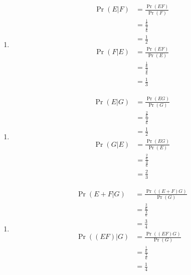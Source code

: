 \documentclass{beamer}
\providecommand{\pr}[1]{\ensuremath{\Pr\left(#1\right)}}
\newcounter{saveenumi}
\newcommand{\conti}{\setcounter{enumi}{\value{saveenumi}}}
\begin{document}
\begin{frame}{}
		\begin{enumerate}
			\item 
			\begin{align}
         \pr{E|F}&=\frac{\pr{EF}}{\pr{F}}\\
                 &=\frac{\frac{1}{6}}{\frac{2}{6}}\\
                 &=\frac{1}{2}\\
         \pr{F|E}&=\frac{\pr{EF}}{\pr{E}}\\
                 &=\frac{\frac{1}{6}}{\frac{3}{6}}\\
                 &=\frac{1}{3}
    \end{align}
		\end{enumerate}
	\end{frame}
	
	\begin{frame}{}
		\begin{enumerate}
		\conti
			\item 
			\begin{align}
         \pr{E|G}&=\frac{\pr{EG}}{\pr{G}}\\
                 &=\frac{\frac{2}{6}}{\frac{4}{6}}\\
                 &=\frac{1}{2}\\
    \pr{G|E}&=\frac{\pr{EG}}{\pr{E}}\\
                 &=\frac{\frac{2}{6}}{\frac{3}{6}}\\
                 &=\frac{2}{3}
    \end{align}
		\end{enumerate}
	\end{frame}
	
	\begin{frame}{}
		\begin{enumerate}
		\conti
			\item 
			\begin{align}
         \pr{E+F|G}&=\frac{\pr{(E+F)G}}{\pr{G}}\\
              &=\frac{\frac{3}{6}}{\frac{4}{6}}\\
              &=\frac{3}{4}\\
    \pr{(EF)|G}&=\frac{\pr{(EF)G}}{\pr{G}}\\
               &=\frac{\frac{1}{6}}{\frac{4}{6}}\\
               &=\frac{1}{4}
    \end{align}
		\end{enumerate}
	\end{frame}

	
	
	
\end{document}
